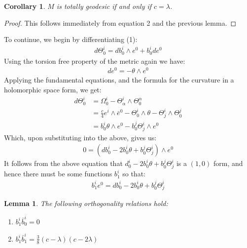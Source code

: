 \documentclass[11pt]{amsart}
\newtheorem{lem}[subsection]{Lemma}
\newtheorem{cor}[subsection]{Corollary}
\theoremstyle{definition}
\begin{document}
\begin{cor} $M$ is totally geodesic if and only if $c = \lambda$.
\end{cor}
%
\begin{proof} This follows immediately from equation 2 and the previous lemma.
\end{proof}

To continue, we begin by differentiating (1):
%
\begin{align*}
d \Theta^i_0 = d b^i_0 \wedge e^0 + b^i_0 d e^0
\end{align*}
%
Using the torsion free property of the metric again we have:
%
\begin{align*}
d e^0 = - \theta \wedge e^0
\end{align*}
%
Applying the fundamental equations, and the formula for the curvature in a holomorphic space form, we get:
%
\begin{align*}
d \Theta^i_0 &= \Omega^i_0 - \Theta^i_{\alpha} \wedge \Theta^{\alpha}_0 \\
&= \frac{c}{4} e^i \wedge \bar{e}^0 - \Theta^i_0 \wedge \theta - \Theta^i_j \wedge \Theta^j_0 \\
&= b^i_0 \theta \wedge e^0 - b^j_0 \Theta^i_j \wedge e^0
\end{align*}
%
Which, upon substituting into the above, gives us:
%
\begin{align*}
0 = ( d b^i_0 - 2 b^i_0 \theta + b^j_0 \Theta^i_j ) \wedge e^0 
\end{align*}
%
It follows from the above equation that $d^i_0 - 2 b^i_0 \theta + b^j_0 \Theta^i_j$ is a $(1,0)$ form, and hence there must be some functions $b^i_1$ so that:
%
\begin{align}
b^i_1 e^0 = d b^i_0 - 2 b^i_0 \theta + b^j_0 \Theta^i_j  
\end{align}

\begin{lem} The following orthogonality relations hold:
%
\begin{enumerate}
\item $b^i_1 \bar{b}^i_0 = 0$
\item $b^i_1 \bar{b}^i_1 = \frac{3}{8}(c - \lambda)(c - 2 \lambda)$
\end{enumerate}
%
\end{lem}
\end{document}
